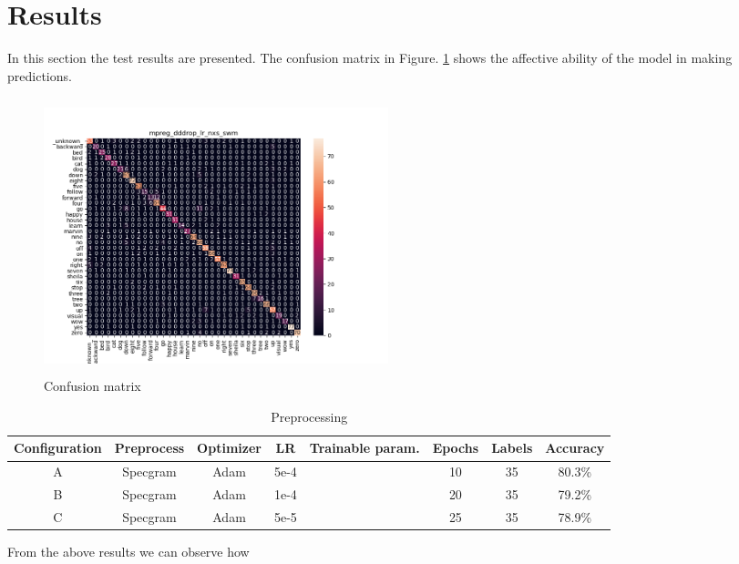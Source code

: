
\section{Results}
\label{sec:results}
\noindent In this section the test results are presented. The confusion matrix in Figure. \ref{fig:conf_matrix_cnn} shows the affective ability of the model in making predictions.

\begin{figure}[h]
			\centering
	    	\includegraphics[width=10cm, height=8cm]{conf_matrix_cnn_dii_cm}
	    	\caption{Confusion matrix}
	    	\label{fig:conf_matrix_cnn}
\end{figure} 

\begin{table}[ht]
	\centering
	\begin{tabular}{|c c c c c c c c|}
		\hline
		Configuration & Preprocess & Optimizer & LR & Trainable param. & Epochs  & Labels & Accuracy \\
		\hline
		A &Specgram&Adam&5e-4&&10&35&80.3\% \\
		B &Specgram&Adam&1e-4&&20&35&79.2\% \\
		C &Specgram&Adam&5e-5&&25&35&78.9\% \\
		\hline
	\end{tabular}
	\caption{Preprocessing}
	\label{table:Pr_eprocessing}
\end{table}



\noindent From the above results we can observe how {}